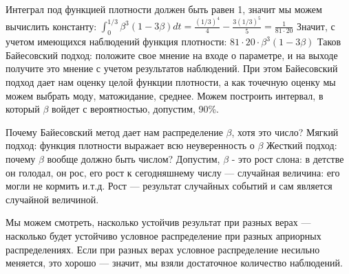 Интеграл под функцией плотности должен быть равен 1, значит мы можем вычислить константу:
$\int_0^{1/3} \beta^3(1-3\beta)dt=\frac{(1/3)^4}{4}-\frac{3(1/3)^5}{5}=\frac{1}{81\cdot20}$
Значит, с учетом имеющихся наблюдений функция плотности:
$81\cdot20\cdot\beta^3(1-3\beta)$
Таков Байесовский подход: положите свое мнение на входе о параметре, и на выходе получите это мнение с учетом результатов наблюдений. 
При этом Байесовский подход дает нам оценку целой функции плотности, а как точечную оценку мы можем выбрать моду, матожидание, среднее. Можем построить интервал, в который $\beta$ войдет с вероятностью, допустим, 90\%.

Почему Байесовский метод дает нам распределение $\beta$, хотя это число?
Мягкий подход: функция плотности выражает всю неуверенность о $\beta$
Жесткий подход: почему $\beta$ вообще должно быть числом? Допустим, $\beta$ - это рост слона: в детстве он голодал, он рос, его рост  к сегодняшнему числу --- случайная величина: его могли не кормить и.т.д. Рост --- результат случайных событий и сам является случайной величиной.

Мы можем смотреть, насколько устойчив результат при разных верах --- насколько будет устойчиво условное распределение при разных априорных распределениях. Если при разных верах условное распределение несильно меняется, это хорошо --- значит, мы взяли достаточное количество наблюдений. 









